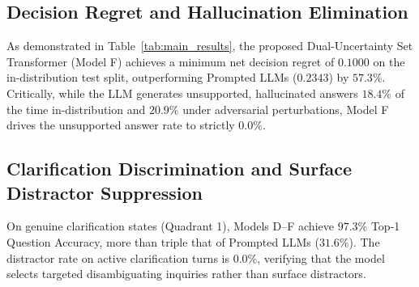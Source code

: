 \subsection{Decision Regret and Hallucination Elimination}
As demonstrated in Table~\ref{tab:main_results}, the proposed Dual-Uncertainty Set Transformer (Model F) achieves a minimum net decision regret of $0.1000$ on the in-distribution test split, outperforming Prompted LLMs ($0.2343$) by $57.3\%$. Critically, while the LLM generates unsupported, hallucinated answers $18.4\%$ of the time in-distribution and $20.9\%$ under adversarial perturbations, Model F drives the unsupported answer rate to strictly $0.0\%$.

\subsection{Clarification Discrimination and Surface Distractor Suppression}
On genuine clarification states (Quadrant 1), Models D--F achieve $97.3\%$ Top-1 Question Accuracy, more than triple that of Prompted LLMs ($31.6\%$). The distractor rate on active clarification turns is $0.0\%$, verifying that the model selects targeted disambiguating inquiries rather than surface distractors.
